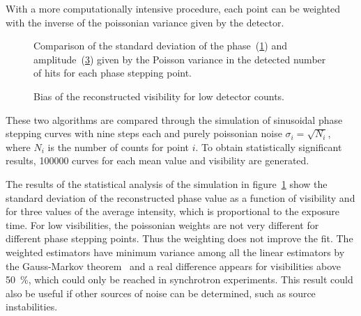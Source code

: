 \documentclass[a4paper]{spie}
\begin{document}
With a more computationally intensive procedure, each point can be weighted
with the inverse of the poissonian variance given by the detector.

\begin{figure}[htb]
    \centering
    \begin{subfigure}[b]{\textwidth}
    \centering
    
    \caption{}
    \label{fig:stats_phase_visibility_sd}
    \end{subfigure}
    \begin{subfigure}[b]{\textwidth}
    \centering
    
    \caption{}
    \label{fig:stats_visibility_visibility_sd}
    \end{subfigure}
    \caption[Variance of the parameters of the phase stepping curves.]{
        Comparison of the standard deviation of the
        phase~(\ref{fig:stats_phase_visibility_sd}) and
    amplitude~(\ref{fig:stats_visibility_visibility_sd}) given by the
    Poisson variance in the detected number of hits for each phase stepping
    point.}
\end{figure}
\begin{figure}[htb]
    \centering
    
    \caption[Bias of the amplitude estimator for low exposure times.]{Bias
    of the reconstructed visibility for low detector counts.}
    \label{fig:stats_visibility_visibility_mean}
\end{figure}
These two algorithms are compared through the simulation of sinusoidal phase
stepping curves with nine steps each and purely poissonian noise $\sigma_i =
\sqrt{N_i}$, where $N_i$ is the number of counts for point $i$.
To obtain statistically significant results, \num{100000} curves for each mean
value and visibility are generated.

The results of the statistical analysis of the simulation in
figure~\ref{fig:stats_phase_visibility_sd} show the standard deviation of
the reconstructed phase value as a function of visibility and for three
values of the average intensity, which is proportional to the exposure
time. For low visibilities, the poissonian weights are not very different
for different phase stepping points. Thus the weighting does not improve
the fit. The weighted estimators have minimum variance
among all the linear estimators by the Gauss-Markov
theorem~\cite{eadie2006statistical} and a real difference appears for
visibilities above \SI{50}{\percent}, which could only be reached in synchrotron
experiments. This result could also be useful if other sources of noise can
be determined, such as source instabilities.
\end{document}
